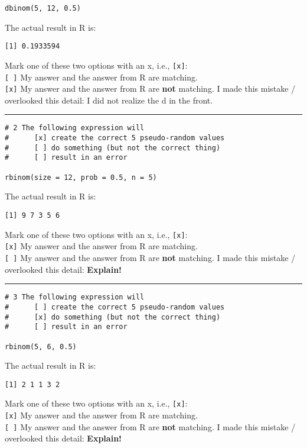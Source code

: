\documentclass[12pt,letterpaper,final]{article}\usepackage[]{graphicx}\usepackage[]{xcolor}
\begin{document}
\begin{enumerate}
\begin{verbatim}
dbinom(5, 12, 0.5)
\end{verbatim}

The actual result in R is: 
\begin{verbatim}
[1] 0.1933594
\end{verbatim}

Mark one of these two options with an x, i.e., \verb|[x]|: \\
\verb|[ ]| My answer and the answer from R are matching. \\
\verb|[x]| My answer and the answer from R are {\bf not} matching. 
I made this mistake / overlooked this detail: I did not realize the d in the front.
\\


\hrule


\begin{verbatim}
# 2 The following expression will
#      [x] create the correct 5 pseudo-random values
#      [ ] do something (but not the correct thing)
#      [ ] result in an error

rbinom(size = 12, prob = 0.5, n = 5)
\end{verbatim}

The actual result in R is: 
\begin{verbatim}
[1] 9 7 3 5 6
\end{verbatim}

Mark one of these two options with an x, i.e., \verb|[x]|: \\
\verb|[x]| My answer and the answer from R are matching. \\
\verb|[ ]| My answer and the answer from R are {\bf not} matching. 
I made this mistake / overlooked this detail: {\bf Explain!} \\


\hrule


\begin{verbatim}
# 3 The following expression will
#      [ ] create the correct 5 pseudo-random values
#      [x] do something (but not the correct thing)
#      [ ] result in an error

rbinom(5, 6, 0.5)
\end{verbatim}

The actual result in R is: 
\begin{verbatim}
[1] 2 1 1 3 2
\end{verbatim}

Mark one of these two options with an x, i.e., \verb|[x]|: \\
\verb|[x]| My answer and the answer from R are matching. \\
\verb|[ ]| My answer and the answer from R are {\bf not} matching. 
I made this mistake / overlooked this detail: {\bf Explain!} \\



\end{enumerate}
\end{document}
